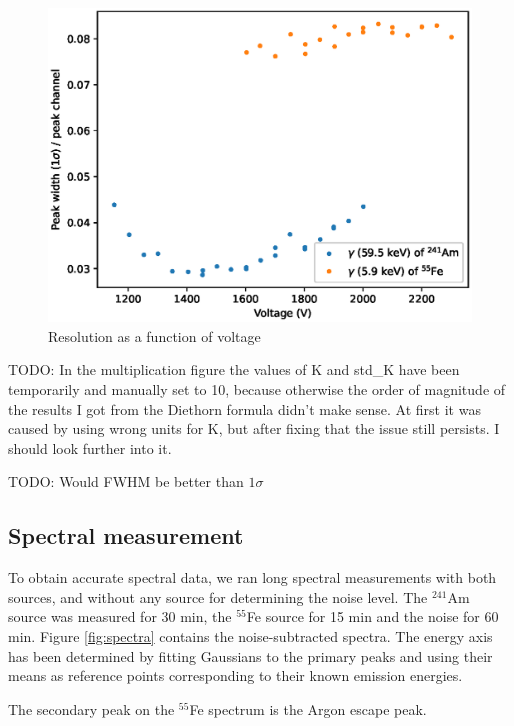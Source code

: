 \documentclass[a4paper]{article}
\newenvironment{todo}{
\color{red}
}
{
}
\begin{document}
\begin{figure}[ht!]
\centering
\includegraphics[width=\textwidth]{fig/python/resolution.eps}
\caption{Resolution as a function of voltage}
\label{fig:gas_mult}
\end{figure}

\FloatBarrier
\begin{todo}
TODO: In the multiplication figure the values of K and std\_K have been temporarily and manually set to 10, because otherwise the order of magnitude of the results I got from the Diethorn formula didn't make sense.
At first it was caused by using wrong units for K, but after fixing that the issue still persists.
I should look further into it.

TODO: Would FWHM be better than $1 \sigma$
\end{todo}


\clearpage
\subsection{Spectral measurement}
\label{results_spectral}
To obtain accurate spectral data, we ran long spectral measurements with both sources, and without any source for determining the noise level.
The $^{241}$Am source was measured for 30 min, the $^{55}$Fe source for 15 min and the noise for 60 min.
Figure \ref{fig:spectra} contains the noise-subtracted spectra.
The energy axis has been determined by fitting Gaussians to the primary peaks and using their means as reference points corresponding to their known emission energies.

The secondary peak on the $^{55}$Fe spectrum is the Argon escape peak.
\end{document}

